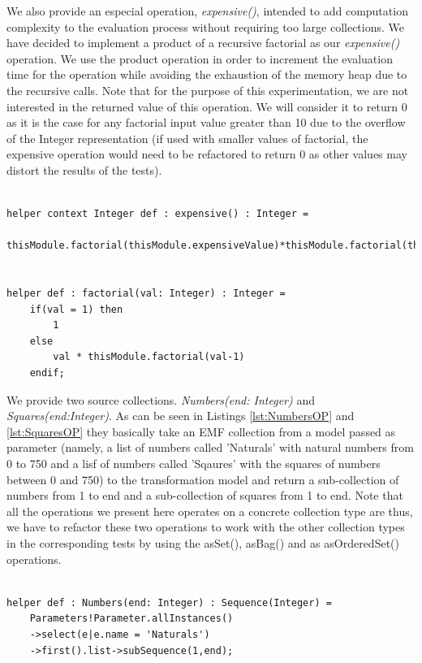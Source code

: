 We also provide an especial operation, \emph{expensive()}, intended to
add computation complexity to the evaluation process without requiring too large
collections. We have decided to implement a product of a recursive factorial as
our \emph{expensive()} operation. We use the product operation in
order to increment the evaluation time for the operation while avoiding the 
exhaustion of the memory heap due to the recursive calls. Note that for the
purpose of this experimentation, we are not interested in the returned value of
this operation. We will consider it to return 0 as it is the case for any
factorial input value greater than 10 due to the overflow of the Integer
representation (if used with smaller values of factorial, the expensive
operation would need to be refactored to return 0 as other values may distort
the results of the tests).

\begin{lstlisting}[language=ATL, style=AMMA,
label=lst:expensiveOP, caption=expensive() operation] 

helper context Integer def : expensive() : Integer =
	thisModule.factorial(thisModule.expensiveValue)*thisModule.factorial(thisModule.expensiveValue);
		

helper def : factorial(val: Integer) : Integer =
	if(val = 1) then 
		1
	else
		val * thisModule.factorial(val-1)
	endif;

\end{lstlisting}


We provide two source collections. \emph{Numbers(end: Integer)} and
\emph{Squares(end:Integer)}. As can be seen in Listings \ref{lst:NumbersOP} and
\ref{lst:SquaresOP} they basically take an EMF collection from a model passed as
parameter (namely, a list of numbers called 'Naturals' with natural numbers from
0 to 750 and a lisf of numbers called 'Sqaures' with the squares of numbers
between 0 and 750) to the transformation model and return a sub-collection of
numbers from 1 to end and a sub-collection of squares from 1 to end. Note that
all the operations we present here operates on a concrete collection type are
thus, we have to refactor these two operations to work with the other collection
types in the corresponding tests by using the asSet(), asBag() and as
asOrderedSet() operations.

\begin{lstlisting}[language=ATL, style=AMMA,
label=lst:NumbersOP, caption=Numbers() operation] 

helper def : Numbers(end: Integer) : Sequence(Integer) =
	Parameters!Parameter.allInstances()
	->select(e|e.name = 'Naturals')
	->first().list->subSequence(1,end);


\end{lstlisting}

